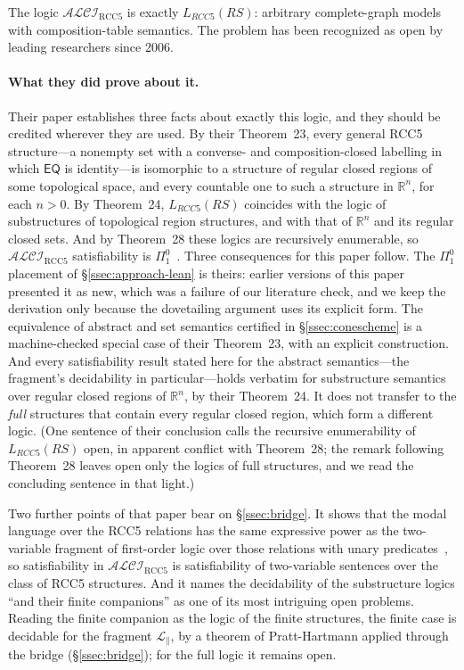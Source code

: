 \documentclass[11pt]{article}
\newcommand{\ALCIRCC}[1]{\mathcal{ALCI}_{\mathrm{RCC#1}}}
\newcommand{\EQ}{\mathsf{EQ}}
\newcommand{\reals}{\mathbb{R}}
\newcommand{\LRCC}[1]{\ensuremath{L_{\mathit{RCC#1}}}}
\theoremstyle{plain}
\theoremstyle{definition}
\begin{document}
The logic $\ALCIRCC{5}$ is exactly $\LRCC{5}(\mathit{RS})$:
arbitrary complete-graph models with composition-table semantics.
The problem has been recognized as open by leading researchers
since 2006.

\paragraph{What they did prove about it.} Their paper establishes three
facts about exactly this logic, and they should be credited wherever they
are used. By their Theorem~23, every general RCC5 structure---a nonempty set
with a converse- and composition-closed labelling in which $\EQ$ is
identity---is isomorphic to a structure of regular closed regions of some
topological space, and every countable one to such a structure in
$\reals^n$, for each $n>0$. By Theorem~24, $\LRCC{5}(\mathit{RS})$ coincides
with the logic of substructures of topological region structures, and with
that of $\reals^n$ and its regular closed sets. And by Theorem~28 these
logics are recursively enumerable, so $\ALCIRCC{5}$ satisfiability is
$\Pi^0_1$~\cite{LutzWolter2006}. Three consequences for this paper follow.
The $\Pi^0_1$ placement of \S\ref{ssec:approach-lean} is theirs: earlier
versions of this paper presented it as new, which was a failure of our
literature check, and we keep the derivation only because the dovetailing
argument uses its explicit form. The equivalence of abstract and set
semantics certified in \S\ref{ssec:conescheme} is a machine-checked special
case of their Theorem~23, with an explicit construction. And every
satisfiability result stated here for the abstract semantics---the
fragment's decidability in particular---holds verbatim for substructure
semantics over regular closed regions of $\reals^n$, by their Theorem~24. It
does not transfer to the \emph{full} structures that contain every regular
closed region, which form a different logic. (One sentence of their
conclusion calls the recursive enumerability of $\LRCC{5}(\mathit{RS})$
open, in apparent conflict with Theorem~28; the remark following Theorem~28
leaves open only the logics of full structures, and we read the concluding
sentence in that light.)

Two further points of that paper bear on \S\ref{ssec:bridge}. It shows that
the modal language over the RCC5 relations has the same expressive power as
the two-variable fragment of first-order logic over those relations with unary
predicates~\cite[\S8, cf.\ Thm.~2]{LutzWolter2006}, so satisfiability in
$\ALCIRCC{5}$ is satisfiability of two-variable sentences over the class of
RCC5 structures. And it names the decidability of the substructure logics
``and their finite companions'' as one of its most intriguing open problems.
Reading the finite companion as the logic of the finite structures, the finite
case is decidable for the fragment $\mathcal L_{\parallel}$, by a theorem of
Pratt-Hartmann applied through the bridge (\S\ref{ssec:bridge}); for the full
logic it remains open.
\end{document}
